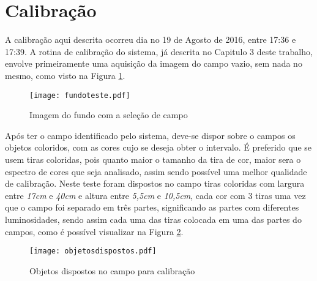\section{Calibração}
A calibração aqui descrita ocorreu dia no 19 de Agosto de 2016, entre 17:36 e 17:39.
A rotina de calibração do sistema, já descrita no Capitulo 3 deste trabalho, envolve primeiramente uma aquisição da imagem do campo vazio, sem nada no mesmo, como visto na Figura \ref{campovazio}.
\begin{figure}[H]
		\centering
		\texttt{[image: fundoteste.pdf]}
		\caption{Imagem do fundo com a seleção de campo}
		\label{campovazio}
	\end{figure}
Após ter o campo identificado pelo sistema, deve-se dispor sobre o campos os objetos coloridos, com as cores cujo se deseja obter o intervalo. É preferido que se usem tiras coloridas, pois quanto maior o tamanho da tira de cor, maior sera o espectro de cores que seja analisado, assim sendo possível uma melhor qualidade de calibração.
Neste teste foram dispostos no campo tiras coloridas com largura entre \textit{17cm} e \textit{40cm} e altura entre \textit{5,5cm} e \textit{10,5cm}, cada cor com 3 tiras uma vez que o campo foi separado em três partes, significando as partes com diferentes luminosidades, sendo assim cada uma das tiras colocada em uma das partes do campos, como é possível visualizar na Figura \ref{fig:objetodispostos}.
	
	\begin{figure}[H]
\centering
\texttt{[image: objetosdispostos.pdf]}
\caption{Objetos dispostos no campo para calibração}
\label{fig:objetodispostos}
\end{figure}	
	
